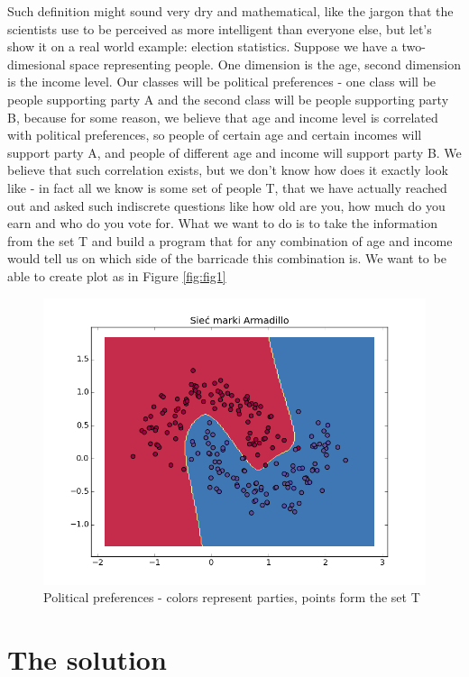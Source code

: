 \documentclass[3p,twocolumn]{elsarticle}
\begin{document}
Such definition might sound very dry and mathematical, like the jargon that the scientists use to be perceived as more intelligent than everyone else, but let's show it on a real world example: election statistics. Suppose we have a two-dimesional space representing people. One dimension is the age, second dimension is the income level. Our classes will be political preferences - one class will be people supporting party A and the second class will be people supporting party B, because for some reason, we believe that age and income level is correlated with political preferences, so people of certain age and certain incomes will support party A, and people of different age and income will support party B. We believe that such correlation exists, but we don't know how does it exactly look like - in fact all we know is some set of people T, that we have actually reached out and asked such indiscrete questions like how old are you, how much do you earn and who do you vote for. What we want to do is to take the information from the set T and build a program that for any combination of age and income would tell us on which side of the barricade this combination is. We want to be able to create plot as in Figure \ref{fig:fig1}

\begin{figure}[h]
	
\label{fig:fig1}
  \includegraphics[width=\linewidth]{figure_1.png}
	\caption{Political preferences - colors represent parties, points form the set T}
	\label{fig1}
\end{figure}


\section{The solution}
\end{document}
